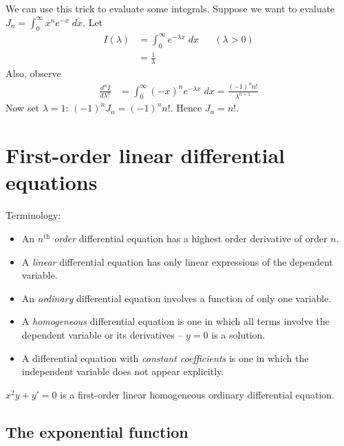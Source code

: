 \documentclass{../../template/note}
\begin{document}
    \begin{example}
        We can use this trick to evaluate some integrals. Suppose we want to evaluate \(J_n = \int_0^\infty x^n e^{-x} \; dx\). Let
        \begin{align*}
            I(\lambda) &= \int_0^\infty e^{-\lambda x} \; dx && (\lambda > 0) \\
            &= \frac{1}{\lambda}
        \end{align*}
        Also, observe
        \begin{align*}
            \frac{d^nI}{d\lambda^n} &= \int_0^\infty (-x)^n e^{-\lambda x} \; dx = \frac{(-1)^n n!}{\lambda^{n+1}}
        \end{align*}
        Now set \(\lambda = 1\): \((-1)^n J_n = (-1)^n n!\). Hence \(J_n = n!\).
    \end{example}
    

    \section{First-order linear differential equations}

    Terminology:
    \begin{itemize}
        \item An \emph{\(n^\text{th}\) order} differential equation has a highest order derivative of order \(n\).
        \item A \emph{linear} differential equation has only linear expressions of the dependent variable.
        \item An \emph{ordinary} differential equation involves a function of only one variable.
        \item A \emph{homogeneous} differential equation is one in which all terms involve the dependent variable or its derivatives -- \(y=0\) is a solution.
        \item A differential equation with \emph{constant coefficients} is one in which the independent variable does not appear explicitly.
    \end{itemize}
    
    \begin{example}
        \(x^2y+y'=0\) is a first-order linear homogeneous ordinary differential equation.
    \end{example}
    
    \subsection{The exponential function}
\end{document}
